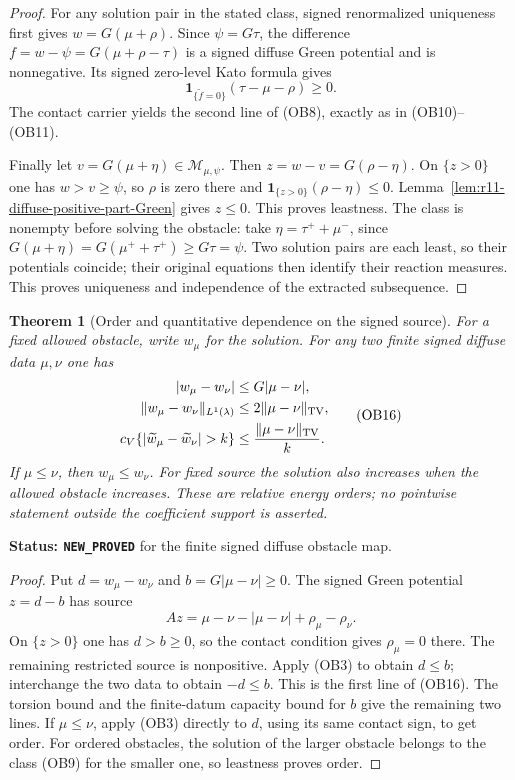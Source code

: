 \documentclass[11pt,a4paper]{article}
\numberwithin{equation}{section}
\newtheorem{theorem}{Theorem}[section]
\theoremstyle{definition}
\theoremstyle{remark}
\begin{document}
\begin{proof}
For any solution pair in the stated class, signed renormalized
uniqueness first gives $w=G(\mu+\rho)$.  Since $\psi=G\tau$,
the difference $f=w-\psi=G(\mu+\rho-\tau)$ is a signed diffuse
Green potential and is nonnegative.  Its signed zero-level Kato
formula gives
\[
                  \mathbf1_{\{\widetilde f=0\}}
                              (\tau-\mu-\rho)\ge0.
\]
The contact carrier yields the second line of (OB8), exactly as in
(OB10)--(OB11).

Finally let $v=G(\mu+\eta)\in\mathscr M_{\mu,\psi}$.
Then $z=w-v=G(\rho-\eta)$.  On $\{z>0\}$ one has
$w>v\ge\psi$, so $\rho$ is zero there and
$\mathbf1_{\{z>0\}}(\rho-\eta)\le0$.
Lemma~\ref{lem:r11-diffuse-positive-part-Green} gives $z\le0$.
This proves leastness.  The class is nonempty before solving the
obstacle: take $\eta=\tau^++\mu^-$, since
$G(\mu+\eta)=G(\mu^++\tau^+)\ge G\tau=\psi$.
Two solution pairs are each least, so their potentials coincide;
their original equations then identify their reaction measures.
This proves uniqueness and independence of the extracted subsequence.
\end{proof}

\begin{theorem}[Order and quantitative dependence on the signed source]
\label{thm:r11-diffuse-obstacle-stability}
For a fixed allowed obstacle, write $w_\mu$ for the solution.
For any two finite signed diffuse data $\mu,\nu$ one has
\[
 \begin{split}
 |w_\mu-w_\nu|&\le G|\mu-\nu|,\\
 \|w_\mu-w_\nu\|_{L^1(\lambda)}&\le2\|\mu-\nu\|_{\rm TV},\\
 c_V\{|\widetilde w_\mu-\widetilde w_\nu|>k\}
                              &\le\frac{\|\mu-\nu\|_{\rm TV}}{k}.
 \end{split}
 \tag{OB16}
\]
If $\mu\le\nu$, then $w_\mu\le w_\nu$.
For fixed source the solution also increases when the allowed
obstacle increases.  These are relative energy orders; no pointwise
statement outside the coefficient support is asserted.
\end{theorem}

\noindent\textbf{Status: \texttt{NEW\_PROVED}} for the finite
signed diffuse obstacle map.

\begin{proof}
Put $d=w_\mu-w_\nu$ and $b=G|\mu-\nu|\ge0$.
The signed Green potential $z=d-b$ has source
\[
            Az=\mu-\nu-|\mu-\nu|+\rho_\mu-\rho_\nu.
\]
On $\{z>0\}$ one has $d>b\ge0$, so the contact condition gives
$\rho_\mu=0$ there.  The remaining restricted source is
nonpositive.  Apply (OB3) to obtain $d\le b$; interchange the two
data to obtain $-d\le b$.  This is the first line of (OB16).
The torsion bound and the finite-datum capacity bound for $b$
give the remaining two lines.  If $\mu\le\nu$, apply (OB3)
directly to $d$, using its same contact sign, to get order.
For ordered obstacles, the solution of the larger obstacle belongs
to the class (OB9) for the smaller one, so leastness proves order.
\end{proof}
\end{document}
